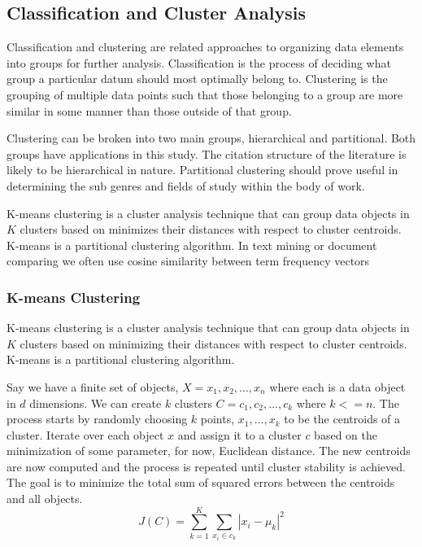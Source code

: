 \documentclass[12pt]{article}
\begin{document}
\begin{doublespacing}
\subsection{Classification and Cluster Analysis}
Classification and clustering are related approaches to organizing data elements into groups for further analysis.
Classification is the process of deciding what group a particular datum should most optimally belong to.
Clustering is the grouping of multiple data points such that those belonging to a group are more similar in some manner than those outside of that group.

Clustering can be broken into two main groups, hierarchical and partitional.
Both groups have applications in this study.
The citation structure of the literature is likely to be hierarchical in nature.
Partitional clustering should prove useful in determining the sub genres and fields of study within the body of work.

K-means clustering is a cluster analysis technique that can group data objects in $K$ clusters based on minimizes their distances with respect to cluster centroids.
K-means is a partitional clustering algorithm.
In text mining or document comparing we often use cosine similarity between term frequency vectors

\subsubsection{K-means Clustering}
K-means clustering is a cluster analysis technique that can group data objects in $K$ clusters based on minimizing their distances with respect to cluster centroids.
K-means is a partitional clustering algorithm.

Say we have a finite set of objects,  $X = {x_1, x_2, ..., x_n}$ where each is a data object in $d$ dimensions.
We can create $k$ clusters $C = {c_1, c_2, ..., c_k}$ where $k <= n$.
The process starts by randomly choosing $k$ points, ${x_1, ..., x_k}$ to be the centroids of a cluster.
Iterate over each object $x$ and assign it to a cluster $c$ based on the minimization of some parameter, for now, Euclidean distance.
The new centroids are now computed and the process is repeated until cluster stability is achieved.
The goal is to minimize the total sum of squared errors between the centroids and all objects. 
\begin{equation} \label{kmeans}
J(C) = \sum^K_{k=1} \sum_{x_i \in c_k} \left| x_i - \mu_k \right| ^2
\end{equation}


\end{doublespacing}
\end{document}
